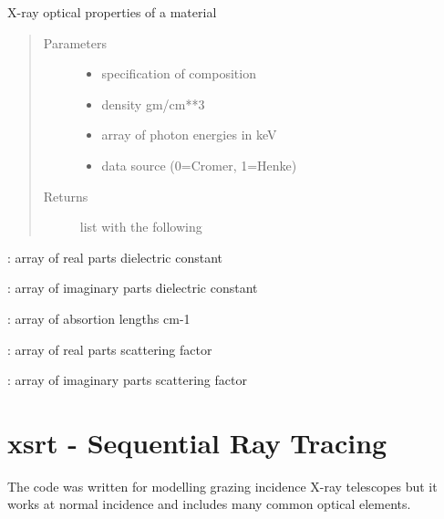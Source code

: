 \documentclass[letterpaper,10pt,english]{sphinxmanual}
\begin{document}
\begin{fulllineitems}
\label{\detokenize{xscat_functions:xscat.xopt}}
X-ray optical properties of a material
\begin{quote}\begin{description}
\item[{Parameters}] \leavevmode\begin{itemize}
\item {} 
 \textendash{} specification of composition

\item {} 
 \textendash{} density gm/cm**3

\item {} 
 \textendash{} array of photon energies in keV

\item {} 
 \textendash{} data source (0=Cromer, 1=Henke)

\end{itemize}

\item[{Returns}] \leavevmode
list with the following

\end{description}\end{quote}

\begin{DUlineblock}{0em}
\item[] :     array of real parts dielectric constant
\item[] :      array of imaginary parts dielectric constant
\item[] :      array of absortion lengths cm-1
\item[] :        array of real parts scattering factor
\item[] :        array of imaginary parts scattering factor
\end{DUlineblock}

\end{fulllineitems}



\chapter{xsrt   - Sequential Ray Tracing}
\label{\detokenize{xsrt:xsrt-sequential-ray-tracing}}\label{\detokenize{xsrt::doc}}
The code was written for modelling grazing incidence X-ray telescopes but it
works at normal incidence and includes many common optical elements.
\end{document}
